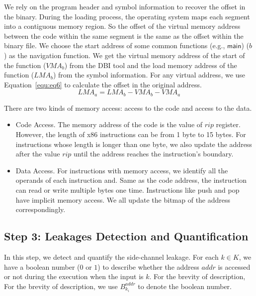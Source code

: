 We rely on the program header and symbol information to recover the
offset in the binary. During the loading process, the operating system
maps each segment into a contiguous memory region. So the offset of
the virtual memory address between the code within the same segment is
the same as the offset within the binary file. We choose the start
address of some common functions (e.g., $\textsf{main}$) ($b$) as the navigation
function. We get the virtual memory address of the start of the
function ($\mathit{VMA}_b$) from the DBI tool and the load memory
address of the function ($\mathit{LMA}_b$) from the symbol
information. For any virtual address, we use Equation~\ref{equ:eq6} to
calculate the offset in the original address.
\begin{equation}\label{equ:eq6}
    \mathit{LMA}_a = \mathit{LMA}_b - \mathit{VMA}_b - \mathit{VMA}_a
\end{equation}

There are two kinds of memory access: access to the code and access to the data. 
\begin{itemize}
\item Code Access. The memory address of the code is the value of $\mathit{rip}$ register. However, the length of x86 instructions can be from 1 byte to 15 bytes. For instructions whose length is longer than one byte, we also update the address after the value $\mathit{rip}$ until the address reaches the instruction's boundary.
\item Data Access. For instructions with memory access, we identify all the operands of each instruction and. Same as the code address, the instruction can read or write multiple bytes one time.  Instructions like \textsf{push} and \textsf{pop} have implicit memory access. We all update the bitmap of the address correspondingly.
\end{itemize}

\subsection{Step 3: Leakages Detection and Quantification}
In this step, we detect and quantify the side-channel leakage. For each $k \in K$, we have a boolean number ($0$ or $1$) to describe whether the address $addr$ is accessed or not during the execution when the input is $k$. For the brevity of description, For the brevity of description, we use $B^{addr}_{k_i}$ to denote the boolean number. 



